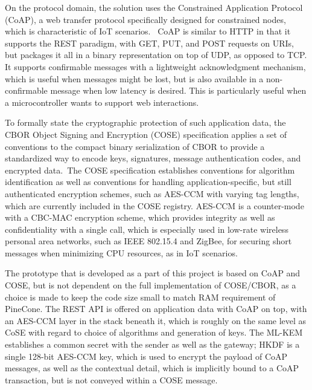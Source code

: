 \documentclass[a4paper]{scrartcl}
\begin{document}
    On the protocol domain, the solution uses the Constrained Application Protocol (CoAP), a web transfer protocol specifically designed for constrained nodes, which is characteristic of IoT scenarios.~\cite{shelby2014} CoAP is similar to HTTP in that it supports the REST paradigm, with GET, PUT, and POST requests on URIs, but packages it all in a binary representation on top of UDP, as opposed to TCP. It supports confirmable messages with a lightweight acknowledgment mechanism, which is useful when messages might be lost, but is also available in a non-confirmable message when low latency is desired. This is particularly useful when a microcontroller wants to support web interactions.~\cite{shelby2014}

    To formally state the cryptographic protection of such application data, the CBOR Object Signing and Encryption (COSE) specification applies a set of conventions to the compact binary serialization of CBOR to provide a standardized way to encode keys, signatures, message authentication codes, and encrypted data.~\cite{schaad2022}The COSE specification establishes conventions for algorithm identification as well as conventions for handling application-specific, but still authenticated encryption schemes, such as AES-CCM with varying tag lengths, which are currently included in the COSE registry. AES-CCM is a counter-mode with a CBC-MAC encryption scheme, which provides integrity as well as confidentiality with a single call, which is especially used in low-rate wireless personal area networks, such as IEEE 802.15.4 and ZigBee, for securing short messages when minimizing CPU resources, as in IoT scenarios.~\cite{Naveen2024}

    The prototype that is developed as a part of this project is based on CoAP and COSE, but is not dependent on the full implementation of COSE/CBOR, as a choice is made to keep the code size small to match RAM requirement of PineCone. The REST API is offered on application data with CoAP on top, with an AES-CCM layer in the stack beneath it, which is roughly on the same level as CoSE with regard to choice of algorithms and generation of keys. The ML-KEM establishes a common secret with the sender as well as the gateway; HKDF is a single 128-bit AES-CCM key, which is used to encrypt the payload of CoAP messages, as well as the contextual detail, which is implicitly bound to a CoAP transaction, but is not conveyed within a COSE message.~\cite{shelby2014} ~\cite{schaad2022}
\end{document}
